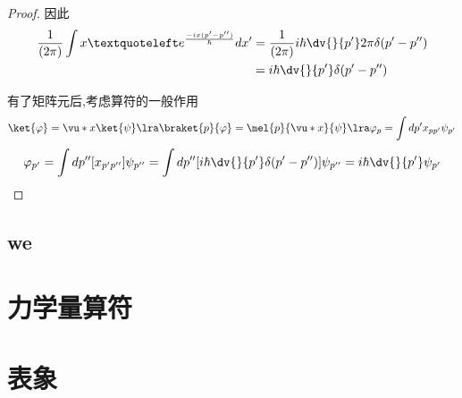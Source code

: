 \begin{proof}
                因此
                \begin{align*}
                     \frac{1}{(2 \pi)} \int x‘ e^{\frac{-ix(p'-p'')}{\hbar}}   dx' &=  \frac{1}{(2 \pi)}  i\hbar \dv{}{p'} 2\pi \delta(p'-p'')    \\
                                                                                  &= i \hbar \dv{}{p'} \delta(p'-p'')                          \\                                   
                \end{align*}

                有了矩阵元后,考虑算符的一般作用
                $$ \ket{\varphi} = \vu*{x} \ket{\psi} \lra \braket{p}{\varphi}=\mel{p}{\vu*{x}}{\psi} \lra \varphi_{p} = \int dp' x_{pp'} \psi_{p'}$$
                $$ \varphi_{p'} =  \int dp'' [x_{p'p''}] \psi_{p''} = \int dp'' [i \hbar \dv{}{p'} \delta(p'-p'')] \psi_{p''} = i\hbar \dv{}{p'} \psi_{p'} $$

                
            
            \end{proof}


        \subsection{we}

            
            
        
        
                         
                    
                



                
            
        
        
            

            
        
        
        
        
    
        
    
    
    

      

    \section{力学量算符}


    \section{表象}


